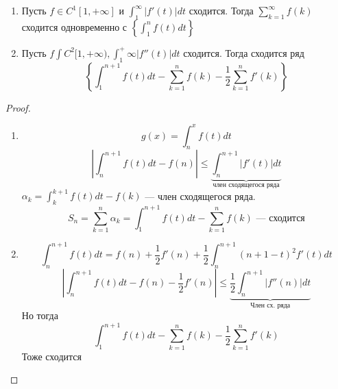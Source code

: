 \begin{proposition}\indent
    \begin{enumerate}
        \item Пусть \(f \in C^1[1, +\infty]\) и \(\int_1^\infty|f'(t)|dt\) сходится. Тогда \(\sum_{k = 1}^\infty f(k)\) сходится одновременно с \(\left\{\int_1^n f(t)dt\right\}\)
        \item Пусть \(f \int C^2[1, +\infty), \int_1^+\infty|f''(t)|dt\) сходится. Тогда сходится ряд
        \[\left\{\int_1^{n + 1}f(t)dt - \sum_{k = 1}^n f(k) - \frac{1}{2}\sum_{k = 1}^nf'(k)\right\}\]
    \end{enumerate}
\end{proposition}
\begin{proof}
    \begin{enumerate}
        \item \[g(x) = \int_n^xf(t)dt \]
        \[\left|\int_n^{n + 1}f(t)dt - f(n)\right| \le \underbrace{\int_n^{n + 1}|f'(t)|dt}_{\text{член сходящегося ряда}}\]
        \(\alpha_k = \int_k^{k + 1}f(t)dt - f(k)\) --- член сходящегося ряда.
        \[S_n = \sum_{k = 1}^n \alpha_k = \int_1^{n + 1}f(t)dt - \sum_{k = 1}^nf(k) \text{ --- сходится}\]
        \item \[\int_n^{n + 1}f(t)dt = f(n) + \frac{1}{2}f'(n) + \frac{1}{2}\int_n^{n + 1}(n + 1 - t)^2f'(t)dt\]
        \[\left|\int_n^{n + 1}f(t)dt - f(n) - \frac{1}{2}f'(n)\right| \le \underbrace{\frac{1}{2}\int_n^{n + 1}|f''(n)|dt}_{\text{Член сх. ряда}}\]
        Но тогда 
        \[\int_1^{n + 1}f(t)dt - \sum_{k = 1}^nf(k) - \frac{1}{2}\sum_{k = 1}^nf'(k)\]
        Тоже сходится
    \end{enumerate}
\end{proof}